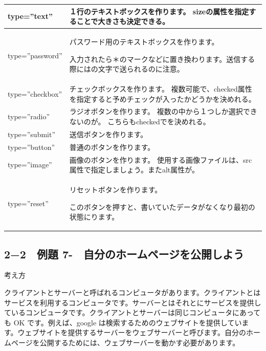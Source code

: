 \documentclass[a4paper,12pt,dvipdfmx]{jarticle}
\newcounter{Exercise}
\renewcommand\theExercise{例題 7-\arabic{Exercise}}
\begin{document}
\begin{flushleft}
	\tablefirsthead{}
	\tablehead{}
	\tabletail{}
	\tablelasttail{}
	\begin{supertabular}{|m{3.4459999cm}|m{7.9160004cm}|}
		\hline
		type=”text” &
		１行のテキストボックスを作ります。\newline
		sizeの属性を指定することで大きさも決定できる。\\\hline
		type=”password” &
		パスワード用のテキストボックスを作ります。\newline

		入力されたら＊のマークなどに置き換わります。送信する際にはの文字で送られるのに注意。\\\hline
		type=”checkbox” &
		チェックボックスを作ります。
		複数可能で、checked属性を指定すると予めチェックが入ったかどうかを決めれる。\\\hline
		type=”radio” &
		ラジオボタンを作ります。
		複数の中から１つしか選択できないのが。\newline
		こちらもcheckedでを決めれる。\\\hline
		type=”submit” &
		送信ボタンを作ります。\\\hline
		type=”button” &
		普通のボタンを作ります。\\\hline
		type=”image” &
		画像のボタンを作ります。\newline
		使用する画像ファイルは、src属性で指定しましょう。またalt属性が。\\\hline
		type=”reset” &
		リセットボタンを作ります。

		このボタンを押すと、書いていたデータがなくなり最初の状態にります。\\\hline
	\end{supertabular}
\end{flushleft}

\bigskip

\clearpage\subsection*{2−2　\theExercise　自分のホームページを公開しよう}
考え方


クライアントとサーバーと呼ばれるコンピュータがあります。クライアントとはサービスを利用するコンピュータです。サーバーとはそれとにサービスを提供しているコンピュータです。クライアントとサーバーは同じコンピュータにあっても
OK です。例えば、google
は検索するためのウェブサイトを提供しています。ウェブサイトを提供するサーバーをウェブサーバーと呼びます。自分のホームページを公開するためには、ウェブサーバーを動かす必要があります。
\end{document}
